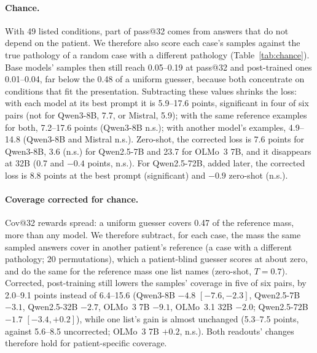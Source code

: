 \documentclass[11pt]{article}
\begin{document}
\paragraph{Chance.} With 49 listed conditions, part of pass@32 comes from answers that do not depend on the patient. We therefore also score each case's samples against the true pathology of a random case with a different pathology (Table~\ref{tab:chance}). Base models' samples then still reach 0.05--0.19 at pass@32 and post-trained ones 0.01--0.04, far below the 0.48 of a uniform guesser, because both concentrate on conditions that fit the presentation. Subtracting these values shrinks the loss: with each model at its best prompt it is 5.9--17.6 points, significant in four of six pairs (not for Qwen3-8B, 7.7, or Mistral, 5.9); with the same reference examples for both, 7.2--17.6 points (Qwen3-8B n.s.); with another model's examples, 4.9--14.8 (Qwen3-8B and Mistral n.s.). Zero-shot, the corrected loss is 7.6 points for Qwen3-8B, 3.6 (n.s.) for Qwen2.5-7B and 23.7 for OLMo~3 7B, and it disappears at 32B (0.7 and $-0.4$ points, n.s.). For Qwen2.5-72B, added later, the corrected loss is 8.8 points at the best prompt (significant) and $-0.9$ zero-shot (n.s.).

\paragraph{Coverage corrected for chance.} Cov@32 rewards spread: a uniform guesser covers 0.47 of the reference mass, more than any model. We therefore subtract, for each case, the mass the same sampled answers cover in another patient's reference (a case with a different pathology; 20 permutations), which a patient-blind guesser scores at about zero, and do the same for the reference mass one list names (zero-shot, $T{=}0.7$). Corrected, post-training still lowers the samples' coverage in five of six pairs, by 2.0--9.1 points instead of 6.4--15.6 (Qwen3-8B $-4.8$ $[-7.6,-2.3]$, Qwen2.5-7B $-3.1$, Qwen2.5-32B $-2.7$, OLMo~3 7B $-9.1$, OLMo~3.1 32B $-2.0$; Qwen2.5-72B $-1.7$ $[-3.4,+0.2]$), while one list's gain is almost unchanged (5.3--7.5 points, against 5.6--8.5 uncorrected; OLMo~3 7B $+0.2$, n.s.). Both readouts' changes therefore hold for patient-specific coverage.
\end{document}
